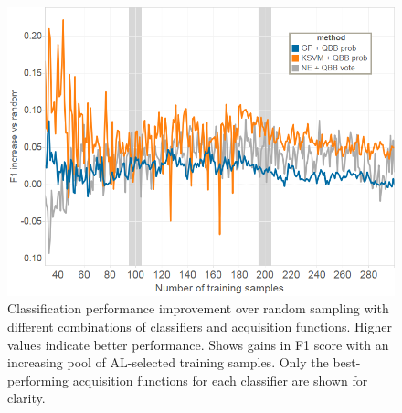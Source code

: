 \documentclass{sig-alternate}
\begin{document}
\begin{figure}[tb]
\centering
\includegraphics[width=\linewidth]{classification_experiment}
\caption{Classification performance improvement over random sampling with different combinations of classifiers and acquisition functions.
Higher values indicate better performance.
Shows gains in F1 score with an increasing pool of AL-selected training samples.
Only the best-performing acquisition functions for each classifier are shown for clarity.
}
\label{fig:cls_all}
\end{figure}
\end{document}
